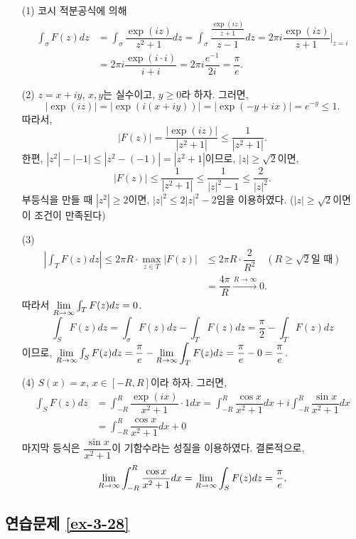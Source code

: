 \begin{itemize}
\item[(1)] 코시 적분공식에 의해
\begin{align*}
\int_\sigma F(z) dz &= \int_\sigma \dfrac{\exp(iz)}{z^2+1}dz
= \int_\sigma \dfrac{\frac{\exp(iz)}{z+1}}{z-1}dz
= 2\pi i \dfrac{\exp(iz)}{z+1}\Big|_{z=i} \\
&= 2\pi i \dfrac{\exp(i\cdot i)}{i+i} = 2\pi i \dfrac{e^{-1}}{2i} = \dfrac\pi e.
\end{align*}

\item[(2)] $z=x+iy$, $x,y$는 실수이고, $y\ge0$라 하자. 그러면,
\[
|\exp(iz)| = |\exp(i(x+iy))| = |\exp(-y+ix)| = e^{-y} \le 1.
\]
따라서,
\[
|F(z)| = \dfrac{|\exp(iz)|}{|z^2+1|} \le \dfrac1{|z^2+1|}.
\]
한편, $|z^2| - |-1| \le |z^2-(-1)| = |z^2+1|$이므로,
$|z|\ge\sqrt{2}$이면,
\[
|F(z)| \le \dfrac1{|z^2+1|} \le \dfrac1{|z|^2-1} \le \dfrac2{|z|^2}.
\]
부등식을 만들 때 $|z^2|\ge 2$이면, $|z|^2\le 2|z|^2 -2$임을 이용하였다.
($|z|\ge\sqrt{2}$이면 이 조건이 만족된다)
\item[(3)] 
\begin{align*}
\left| \int_T F(z)dz \right| 
\le 2\pi R\cdot \max_{z\in T} |F(z)| &\le 2\pi R\cdot \dfrac 2{R^2} 
\quad (R\ge\sqrt{2}\text{일 때})\\
&= \dfrac{4\pi}R \stackrel{R\to\infty}{\longrightarrow} 0.
\end{align*}
따라서 $\lim\limits_{R\to\infty} \int_T F(z) dz = 0$.
\[
\int_S F(z)dz = \int_\sigma F(z) dz - \int_T F(z)dz = \dfrac \pi 2 -  \int_T F(z)dz
\]
이므로,  $\lim\limits_{R\to\infty} \int_S F(z)dz = \displaystyle\frac\pi e -\lim\limits_{R\to\infty} \int_T F(z)dz
= \displaystyle\frac \pi e - 0 = \displaystyle\frac \pi e$.
\item[(4)] $S(x)=x$, $x\in[-R,R]$이라 하자. 그러면,
\begin{align*}
\int_S F(z)dz &= \int_{-R}^R \dfrac{\exp(ix)}{x^2+1}\cdot 1 dx
=\int_{-R}^R \dfrac{\cos x}{x^2+1} dx 
+ i\int_{-R}^R \dfrac{\sin x}{x^2+1} dx \\
&= \int_{-R}^R \dfrac{\cos x}{x^2+1}dx  + 0
\end{align*}
마지막 등식은 $\dfrac{\sin x}{x^2+1}$이 기함수라는 성질을 이용하였다.
결론적으로,
\[
\lim\limits_{R\to\infty} \int_{-R}^R \displaystyle\frac{\cos x}{x^2+1}dx
= \lim\limits_{R\to\infty}\int_S F(z)dz = \displaystyle\frac \pi e.
\]
\end{itemize}

\subsection*{연습문제 \ref{ex-3-28}}

